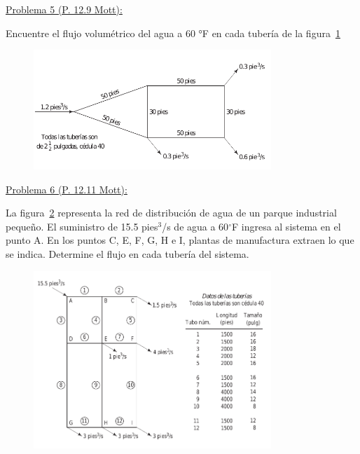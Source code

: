 \documentclass[11pt]{report}
\begin{document}

\newpage
\underline {Problema 5 (P. 12.9 Mott):}
\vspace{0.2cm}

Encuentre el flujo volumétrico del agua a 60 °F en cada tuber\'ia de la figura~\ref{fig:fig5}


\begin{figure}[H]
\centering\includegraphics[width=0.8\textwidth]{Figures/p5.png}
\caption{\label{fig:fig5} }
\end{figure}

\newpage

\underline {Problema 6 (P. 12.11 Mott):}

La figura~\ref{fig:fig6} representa la red de distribución de agua de un parque industrial pequeño. El suministro de 15.5 pies$^3$/s de agua a 60$^\circ$F ingresa al sistema en el punto A. En los puntos C, E, F, G, H e I, plantas de manufactura extraen lo que se indica. Determine el flujo en cada tubería del sistema.

\begin{figure}[H]
\centering\includegraphics[width=0.8\textwidth]{Figures/p6.png}
\caption{\label{fig:fig6} }
\end{figure}
\end{document}
